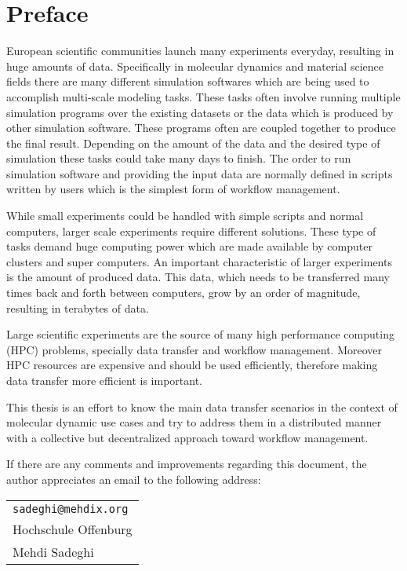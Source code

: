 \chapter*{Preface}
\label{cha:preface}

European scientific communities launch many experiments everyday, resulting in huge amounts
of data. Specifically in molecular dynamics and material science fields there are many different
simulation softwares which are being used to accomplish multi-scale modeling tasks. These tasks
often involve running multiple simulation programs over the existing datasets or the data which is
produced by other simulation software. These programs often are coupled
together to produce the final result. Depending on the amount of the data and the desired type of simulation
these tasks could take many days to finish. The order to run simulation software and 
providing the input data are normally defined in scripts written by users which is the simplest form of workflow management.

While small experiments could be handled with simple scripts and normal computers, larger scale experiments
require different solutions. These type of tasks demand huge computing power which are made available by
computer clusters and super computers. An important characteristic of larger experiments is
the amount of produced data. This data, which needs to be transferred many times back and forth
between computers, grow by an order of magnitude, resulting in terabytes of data.

Large scientific experiments are the source of many high performance computing (HPC) problems, specially data transfer
and workflow management. Moreover HPC resources are expensive and should be used efficiently, therefore making data transfer
more efficient is important.

This thesis is an effort to know the main data transfer scenarios in the context of molecular dynamic use cases and try to address them in
a distributed manner with a collective but decentralized approach toward workflow management.


%
%

If there are any comments and improvements regarding this document, the author
appreciates an email to the following address:

\begin{center}
\begin{tabular}{l}
\nolinkurl{sadeghi@mehdix.org} \\
Hochschule Offenburg\\
Mehdi Sadeghi
\end{tabular}
\end{center}